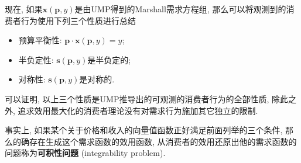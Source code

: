 \documentclass[cn, 12pt, math=mtpro2, bibstyle=apa, blue]{elegantbook}
\newcommand{\p}{\mathbf{p}}
\newcommand{\x}{\mathbf{x}}
\begin{document}
现在, 如果$\x(\p,y)$是由UMP得到的Marshall需求方程组, 那么可以将观测到的消费者行为使用下列三个性质进行总结
\begin{itemize}
  \item 预算平衡性: $\p\cdot\x(\p,y)=y$;
  \item 半负定性: $\mathbf{s}(\p,y)$是半负定的;
  \item 对称性: $\mathbf{s}(\p,y)$是对称的.
\end{itemize}
可以证明, 以上三个性质是UMP推导出的可观测的消费者行为的全部性质, 除此之外, 追求效用最大化的消费者理论没有对需求行为施加其它独立的限制.

事实上, 如果某个关于价格和收入的向量值函数正好满足前面列举的三个条件, 那么的确存在生成这个需求函数的效用函数, 从消费者的效用还原出他的需求函数的问题称为\textbf{可积性问题} (integrability problem).
\end{document}
